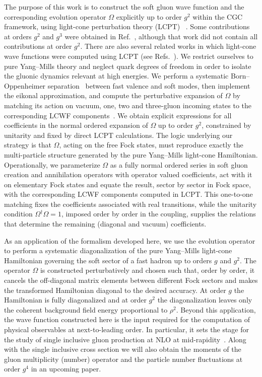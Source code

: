 \documentclass[a4paper,11pt]{article}
\begin{document}
The purpose of this work is to construct the soft gluon wave function and the corresponding evolution operator $\Omega$ explicitly up to order $g^{2}$ within the CGC framework, using light-cone perturbation theory (LCPT) ~\cite{kovchegov2013quantum,munier2026unitary,Brodsky:1997de}. Some contributions at orders $g^{2}$ and $g^{3}$ were obtained in Ref.~\cite{Lublinsky:2016meo}, although that work did not contain all contributions at order $g^{2}$. There are also several related works in which light-cone wave functions were computed using LCPT (see Refs.~\cite{munier2025extracting,lappi2026two,munier2026unitary,hanninen2018one,lappi2017one}). We restrict ourselves to pure Yang–Mills theory and neglect quark degrees of freedom in order to isolate the gluonic dynamics relevant at high energies. We perform a systematic Born–Oppenheimer separation~\cite{Duan:2024qck,Duan:2024qev,Duan:2024aol} between fast valence and soft modes, then implement the eikonal approximation, and compute the perturbative expansion of $\Omega$ by matching its action on vacuum, one, two and three-gluon incoming states to the corresponding LCWF components~\cite{McLerran:1993ka,McLerran:1993ni,Lublinsky:2016meo}. We obtain explicit expressions for all coefficients in the normal ordered expansion of $\Omega$ up to order $g^{2}$, constrained by unitarity and fixed by direct LCPT calculations. The logic underlying our strategy is that $\Omega$, acting on the free Fock states, must reproduce exactly the multi-particle structure generated by the pure Yang--Mills light-cone Hamiltonian. Operationally, we parameterize $\Omega$ as a fully normal ordered series in soft gluon creation and annihilation operators with operator valued coefficients, act with it on elementary Fock states and equate the result, sector by sector in Fock space, with the corresponding LCWF components computed in LCPT. This one-to-one matching fixes the coefficients associated with real transitions, while the unitarity condition $\Omega^{\dagger}\Omega = 1$, imposed order by order in the coupling, supplies the relations that determine the remaining (diagonal and vacuum) coefficients.

As an application of the formalism developed here, we use the evolution operator to perform a systematic diagonalization of the pure Yang–Mills light-cone Hamiltonian governing the soft sector of a fast hadron up to orders $g$ and $g^{2}$. The operator $\Omega$ is constructed perturbatively and chosen such that, order by order, it cancels the off-diagonal matrix elements between different Fock sectors and makes the transformed Hamiltonian diagonal to the desired accuracy. At order $g$ the Hamiltonian is fully diagonalized and at order $g^{2}$ the diagonalization leaves only the coherent background field energy proportional to $\rho^{2}$. Beyond this application, the wave function constructed here is the input required for the computation of physical observables at next-to-leading order. In particular, it sets the stage for the study of single inclusive gluon production at NLO at mid-rapidity~\cite{rr}. Along with the single inclusive cross section we will also obtain the moments of the gluon multiplicity (number) operator and the  particle number fluctuations at order $g^{4}$ in an upcoming paper.
\end{document}
